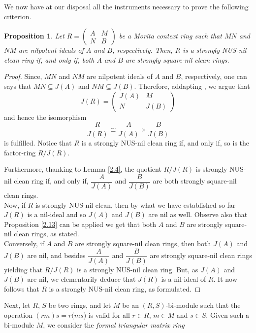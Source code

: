 \documentclass[12pt]{amsart}
\newtheorem{proposition}[theorem]{Proposition}
\theoremstyle{definition}
\begin{document}
\medskip

We now have at our disposal all the instruments necessary to prove the following criterion.

\begin{proposition}\label{2.41}
Let $R=\left(\begin{array}{ll}A & M \\ N & B\end{array}\right)$ be a Morita context ring such that $MN$ and $NM$ are nilpotent ideals of $A$ and $B$, respectively. Then, $R$ is a strongly NUS-nil clean ring if, and only if, both $A$ and $B$ are strongly square-nil clean rings.
\end{proposition}

\begin{proof}
Since, $MN$ and $NM$ are nilpotent ideals of $A$ and $B$, respectively, one can says that $MN \subseteq J(A)$ and $NM\subseteq J(B)$. Therefore, addapting \cite{9}, we argue that $$J(R)=\begin{pmatrix}
		J(A) & M \\
		N & J(B)
\end{pmatrix}$$ and hence the isomorphism $$\dfrac{R}{J(R)}\cong \dfrac{A}{J(A)}\times \dfrac{B}{J(B)}$$ is fulfilled. Notice that $R$ is a strongly NUS-nil clean ring if, and only if, so is the factor-ring $R/J(R)$. 

Furthermore, thanking to Lemma \ref{2.4}, the quotient $R/J(R)$ is strongly NUS-nil clean ring if, and only if, $\dfrac{A}{J(A)}$ and $\dfrac{B}{J(B)}$ are both strongly square-nil clean rings.\\
Now, if $R$ is strongly NUS-nil clean, then by what we have established so far $J(R)$ is a nil-ideal and so $J(A)$ and $J(B)$ are nil as well. Observe also that Proposition \ref{2.13} can be applied we get that both $A$ and $B$ are strongly square-nil clean rings, as stated.\\ 

Conversely, if $A$ and $B$ are strongly square-nil clean rings, then both $J(A)$ and $J(B)$ are nil, and besides $\dfrac{A}{J(A)}$ and $\dfrac{B}{J(B)}$ are strongly square-nil clean rings yielding that $R/J(R)$ is a strongly NUS-nil clean ring. But, as $J(A)$ and $J(B)$ are nil, we elementarily deduce that $J(R)$ is a nil-ideal of $R$. It now follows that $R$ is a strongly NUS-nil clean ring, as formulated.
\end{proof}

Next, let $R$, $S$ be two rings, and let $M$ be an $(R,S)$-bi-module such that the operation $(rm)s = r(ms$) is valid for all $r \in R$, $m \in M$ and $s \in S$. Given such a bi-module $M$, we consider the {\it formal triangular matrix ring}
\end{document}
